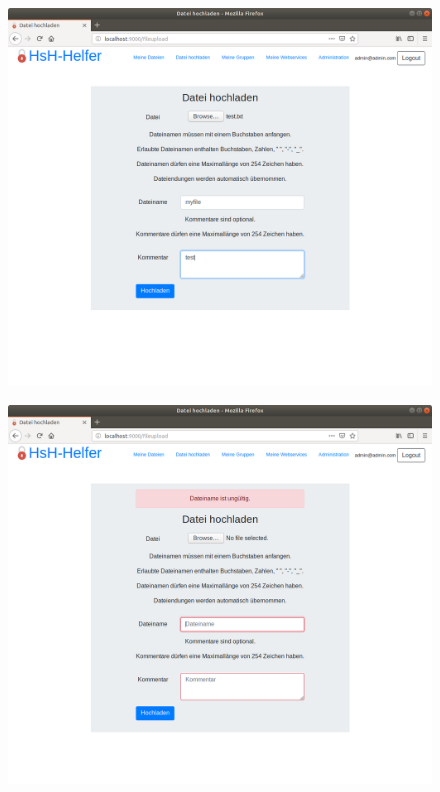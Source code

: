 \documentclass[12pt,DIV14,BCOR10mm,a4paper,parskip=half-,headsepline,headinclude,english,ngerman,bibliography=totocnumbered]{scrreprt}
\begin{document}
\begin{figure}[!htb]
\hspace*{-2.5cm}
	\includegraphics[width=0.8\paperwidth]{resources/upload_fail_1.png}
	\label{upload_fail_1}
\end{figure}

\begin{figure}[!htb]
\hspace*{-2.5cm}
	\includegraphics[width=0.8\paperwidth]{resources/upload_fail_2.png}
	\label{upload_fail_2}
\end{figure}
\end{document}
